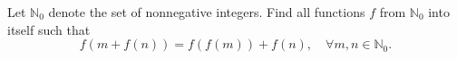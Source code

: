 Let $\mathbb{N}_0$ denote the set of nonnegative integers. Find all functions $f$ from $\mathbb{N}_0$ into itself such that
\[ f(m + f(n)) = f(f(m)) + f(n), \quad \forall m, n \in \mathbb{N}_0. \]
